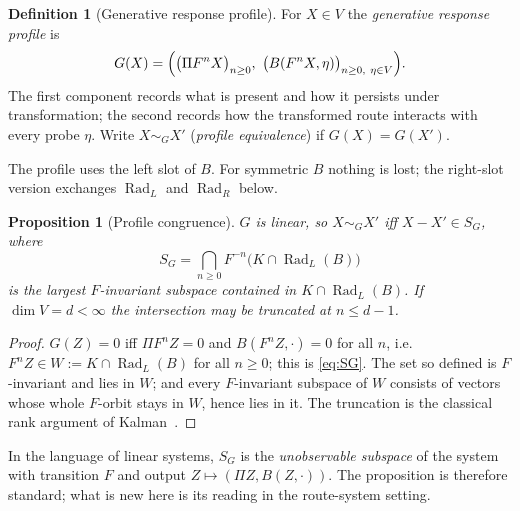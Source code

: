 \documentclass[11pt,a4paper]{article}
\newcommand{\Rad}{\operatorname{Rad}}
\theoremstyle{plain}
\newtheorem{proposition}[theorem]{Proposition}
\theoremstyle{definition}
\newtheorem{definition}[theorem]{Definition}
\begin{document}
\begin{definition}[Generative response profile]\label{def:profile}
For $X\in V$ the \emph{generative response profile} is
\begin{equation}\label{eq:profile}
G(X)=\Bigl(\bigl(\Pi F^nX\bigr)_{n\ge0},\ \bigl(B(F^nX,\eta)\bigr)_{n\ge0,\ \eta\in V}\Bigr).
\end{equation}
The first component records what is present and how it persists under transformation; the second records how the transformed route interacts with every probe $\eta$.
Write $X\sim_GX'$ (\emph{profile equivalence}) if $G(X)=G(X')$.
\end{definition}
The profile uses the left slot of $B$. For symmetric $B$ nothing is lost; the right-slot version exchanges $\Rad_L$ and $\Rad_R$ below.

\begin{proposition}[Profile congruence]\label{prop:profile}
$G$ is linear, so $X\sim_GX'$ iff $X-X'\in S_G$, where
\begin{equation}\label{eq:SG}
S_G=\bigcap_{n\ge0}F^{-n}\bigl(K\cap\Rad_L(B)\bigr)
\end{equation}
is the largest $F$-invariant subspace contained in $K\cap\Rad_L(B)$. If $\dim V=d<\infty$ the intersection may be truncated at $n\le d-1$.
\end{proposition}
\begin{proof}
$G(Z)=0$ iff $\Pi F^nZ=0$ and $B(F^nZ,\cdot)=0$ for all $n$, i.e.\ $F^nZ\in W:=K\cap\Rad_L(B)$ for all $n\ge0$; this is \eqref{eq:SG}.
The set so defined is $F$-invariant and lies in $W$; and every $F$-invariant subspace of $W$ consists of vectors whose whole $F$-orbit stays in $W$, hence lies in it.
The truncation is the classical rank argument of Kalman~\cite{Kal60,Son98}.
\end{proof}
In the language of linear systems, $S_G$ is the \emph{unobservable subspace} of the system with transition $F$ and output $Z\mapsto(\Pi Z,B(Z,\cdot))$. The proposition is therefore standard; what is new here is its reading in the route-system setting.
\end{document}
